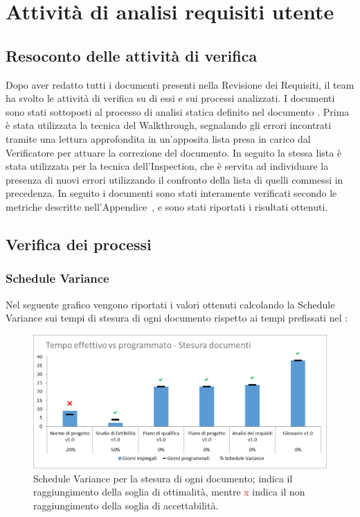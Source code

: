\newpage
\section{Attività di analisi requisiti utente}
\subsection{Resoconto delle attività di verifica}

Dopo aver redatto tutti i documenti presenti nella Revisione dei Requisiti, il team ha svolto le attività di verifica su di essi e sui processi analizzati. I documenti sono stati sottoposti al processo di analisi statica definito nel documento \NdP{}.
Prima è stata utilizzata la tecnica del Walkthrough, segnalando gli errori incontrati tramite una lettura approfondita in un'apposita lista presa in carico dal Verificatore per attuare la correzione del documento. In seguito la stessa lista è stata utilizzata per la tecnica dell'Inspection, che è servita ad individuare la presenza di nuovi errori utilizzando il confronto della lista di quelli commessi in precedenza.
In seguito i documenti sono stati interamente verificati secondo le metriche descritte nell'Appendice~, e sono stati riportati i risultati ottenuti.

\subsection{Verifica dei processi}
\subsubsection{Schedule Variance}
Nel seguente grafico vengono riportati i valori ottenuti calcolando la Schedule Variance sui tempi di stesura di ogni documento rispetto ai tempi prefissati nel \PdP{}:

\begin{figure}[h!]
	\centering
	\includegraphics[scale=0.75]{img/Grafici/SV-Documenti.png}
		\caption{Schedule Variance per la stesura di ogni documento; \textcolor{green}{\checkmark} indica il raggiungimento della soglia di ottimalità, mentre \textcolor{red}{x} indica il non raggiungimento della soglia di accettabilità.}
	\label{fig:SV-Documenti}
\end{figure}

